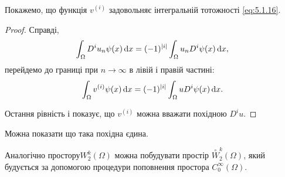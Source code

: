 \begin{proposition}
    Покажемо, що функція $v^{(i)}$ задовольняє інтегральній тотожності \eqref{eq:5.1.16}.
\end{proposition}

\begin{proof}
    Справді,
    \begin{equation*}
        \int_\Omega D^i u_n \psi(x) \mathop{}\!\mathrm{d} x = (-1)^{|i|} \int_\Omega u_n D^i \psi(x) \mathop{}\!\mathrm{d} x,
    \end{equation*}
    перейдемо до границі при $n \to \infty$ в лівій і правій частині:
    \begin{equation}
        \label{eq:5.1.17}
        \int_\Omega v^{(i)} \psi(x) \mathop{}\!\mathrm{d} x = (-1)^{|i|} \int_\Omega u D^i \psi(x) \mathop{}\!\mathrm{d} x.
    \end{equation}

    Остання рівність і показує, що $v^{(i)}$ можна вважати похідною $D^i u$. 
\end{proof}

\begin{remark}
    Можна показати що така похідна єдина.
\end{remark}

\begin{remark}
    Аналогічно простору$W_2^k(\Omega)$ можна побудувати простір $\overset{\circ}{W}_2^k(\Omega)$, який будується за допомогою процедури поповнення простора $C_0^\infty(\Omega)$.
\end{remark}


